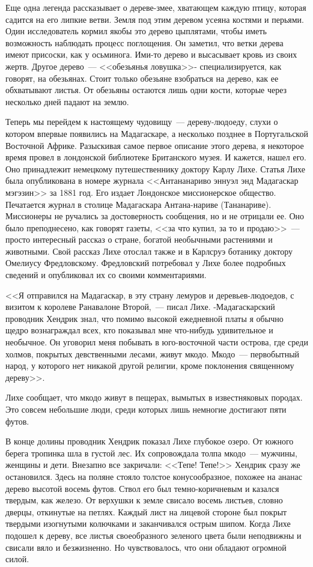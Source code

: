 \documentclass[12pt,a4paper,twoside,openany,svgnames]{memoir}
\begin{document}
Еще одна легенда рассказывает о дереве-змее, хватающем каждую птицу, которая садится на его липкие ветви. Земля под этим деревом усеяна костями и перьями. Один исследователь кормил якобы это дерево цыплятами, чтобы иметь возможность наблюдать процесс поглощения. Он заметил, что ветки дерева имеют присоски, как у осьминога. Ими-то дерево и высасывает кровь из своих жертв. Другое дерево~--- <<обезьянья ловушка>>- специализируется, как говорят, на обезьянах. Стоит только обезьяне взобраться на дерево, как ее обхватывают листья. От обезьяны остаются лишь одни кости, которые через несколько дней падают на землю.

Теперь мы перейдем к настоящему чудовищу~--- дереву-людоеду, слухи о котором впервые появились на Мадагаскаре, а несколько позднее в Португальской Восточной Африке. Разыскивая самое первое описание этого дерева, я некоторое время провел в лондонской библиотеке Британского музея. И кажется, нашел его. Оно принадлежит немецкому путешественнику доктору Карлу Лихе. Статья Лихе была опубликована в номере журнала <<Антананариво эннуэл энд Мадагаскар мэгэзин>> за 1881 год. Его издает Лондонское миссионерское общество. Печатается журнал в столице Мадагаскара Антана-нариве (Тананариве). Миссионеры не ручались за достоверность сообщения, но и не отрицали ее. Оно было преподнесено, как говорят газеты, <<за что купил, за то и продаю>>~--- просто интересный рассказ о стране, богатой необычными растениями и животными. Свой рассказ Лихе отослал также и в Карлсруэ ботанику доктору Омелиусу Фредловскому. Фредловский потребовал у Лихе более подробных сведений и опубликовал их со своими комментариями.

<<Я отправился на Мадагаскар, в эту страну лемуров и деревьев-людоедов, с визитом к королеве Ранавалоне Второй,~--- писал Лихе. -Мадагаскарский проводник Хендрик знал, что помимо высокой ежедневной платы я обычно щедро вознаграждал всех, кто показывал мне что-нибудь удивительное и необычное. Он уговорил меня побывать в юго-восточной части острова, где среди холмов, покрытых девственными лесами, живут мкодо. Мкодо~--- первобытный народ, у которого нет никакой другой религии, кроме поклонения священному дереву>>.

Лихе сообщает, что мкодо живут в пещерах, вымытых в известняковых породах. Это совсем небольшие люди, среди которых лишь немногие достигают пяти футов.

В конце долины проводник Хендрик показал Лихе глубокое озеро. От южного берега тропинка шла в густой лес. Их сопровождала толпа мкодо~--- мужчины, женщины и дети. Внезапно все закричали: <<Тепе! Тепе!>> Хендрик сразу же остановился. Здесь на поляне стояло толстое конусообразное, похожее на ананас дерево высотой восемь футов. Ствол его был темно-коричневым и казался твердым, как железо. От верхушки к земле свисало восемь листьев, словно дверцы, откинутые на петлях. Каждый лист на лицевой стороне был покрыт твердыми изогнутыми колючками и заканчивался острым шипом. Когда Лихе подошел к дереву, все листья своеобразного зеленого цвета были неподвижны и свисали вяло и безжизненно. Но чувствовалось, что они обладают огромной силой.
\end{document}
